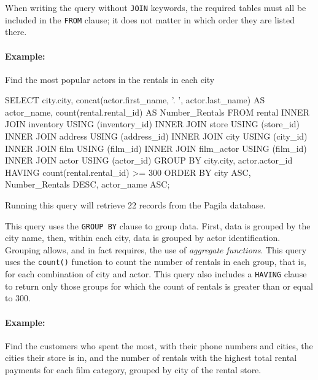When writing the query without \texttt{JOIN} keywords, the required tables must all be included in the \texttt{FROM} clause; it does not matter in which order they are listed there.

\paragraph{Example:} Find the most popular actors in the rentals in each city

\begin{sqlcode}
SELECT city.city, 
       concat(actor.first_name, '. ', actor.last_name) AS actor_name,
       count(rental.rental_id) AS Number_Rentals
  FROM rental
  INNER JOIN inventory USING (inventory_id)
  INNER JOIN store USING (store_id)
  INNER JOIN address USING (address_id)
  INNER JOIN city USING (city_id)
  INNER JOIN film USING (film_id)
  INNER JOIN film_actor USING (film_id)
  INNER JOIN actor USING (actor_id)
  GROUP BY city.city, actor.actor_id
  HAVING count(rental.rental_id) >= 300
  ORDER BY city ASC, 
           Number_Rentals DESC, 
           actor_name ASC;
\end{sqlcode}

Running this query will retrieve 22 records from the Pagila database.

This query uses the \texttt{GROUP BY} clause to group data. First, data is grouped by the city name, then, within each city, data is grouped by actor identification. Grouping allows, and in fact requires, the use of \emph{aggregate functions}. This query uses the \texttt{count()} function to count the number of rentals in each group, that is, for each combination of city and actor. This query also includes a \texttt{HAVING} clause to return only those groups for which the count of rentals is greater than or equal to 300. 

\paragraph*{Example:} Find the customers who spent the most, with their phone numbers and cities, the cities their store is in, and the number of rentals with the highest total rental payments for each film category, grouped by city of the rental store.


